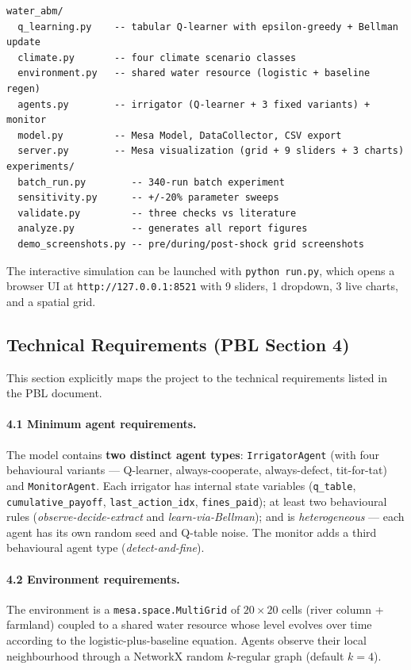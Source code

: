 \documentclass[12pt, a4paper]{article}
\begin{document}
\begin{lstlisting}
water_abm/
  q_learning.py    -- tabular Q-learner with epsilon-greedy + Bellman update
  climate.py       -- four climate scenario classes
  environment.py   -- shared water resource (logistic + baseline regen)
  agents.py        -- irrigator (Q-learner + 3 fixed variants) + monitor
  model.py         -- Mesa Model, DataCollector, CSV export
  server.py        -- Mesa visualization (grid + 9 sliders + 3 charts)
experiments/
  batch_run.py        -- 340-run batch experiment
  sensitivity.py      -- +/-20% parameter sweeps
  validate.py         -- three checks vs literature
  analyze.py          -- generates all report figures
  demo_screenshots.py -- pre/during/post-shock grid screenshots
\end{lstlisting}

The interactive simulation can be launched with \texttt{python run.py}, which
opens a browser UI at \texttt{http://127.0.0.1:8521} with 9 sliders, 1 dropdown,
3 live charts, and a spatial grid.

\subsection{Technical Requirements (PBL Section 4)}

This section explicitly maps the project to the technical requirements listed
in the PBL document.

\paragraph{4.1 Minimum agent requirements.} The model contains \textbf{two
distinct agent types}: \texttt{IrrigatorAgent} (with four behavioural variants
--- Q-learner, always-cooperate, always-defect, tit-for-tat) and
\texttt{MonitorAgent}. Each irrigator has internal state variables
(\texttt{q\_table}, \texttt{cumulative\_payoff}, \texttt{last\_action\_idx},
\texttt{fines\_paid}); at least two behavioural rules (\emph{observe-decide-extract}
and \emph{learn-via-Bellman}); and is \emph{heterogeneous} --- each agent has
its own random seed and Q-table noise. The monitor adds a third behavioural
agent type (\emph{detect-and-fine}).

\paragraph{4.2 Environment requirements.} The environment is a
\texttt{mesa.space.MultiGrid} of $20 \times 20$ cells (river column +
farmland) coupled to a shared water resource whose level evolves over time
according to the logistic-plus-baseline equation. Agents observe their local
neighbourhood through a NetworkX random $k$-regular graph (default $k = 4$).
\end{document}
